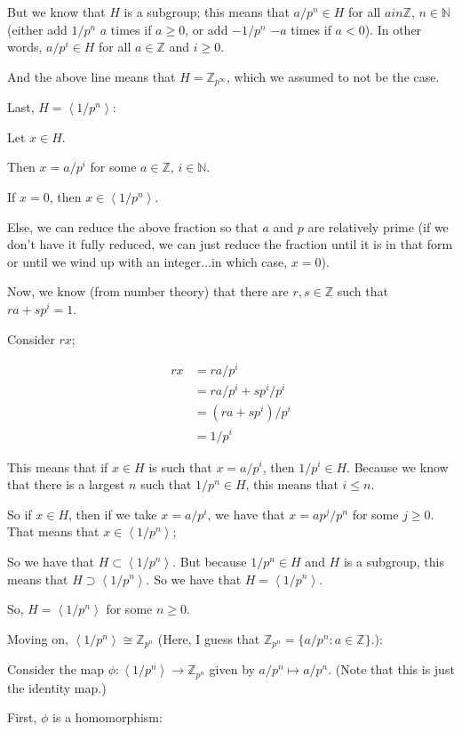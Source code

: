 \documentclass[a4paper,12pt]{article}
\newcommand{\tab}{\hspace{4mm}} %
\newcommand{\anbrack}[1]{\left\langle #1 \right\rangle}
\newcommand{\N}{\mathbb{N}}
\newcommand{\Z}{\mathbb{Z}}
\begin{document}
\tab But we know that $H$ is a subgroup; this means that $a/p^n \in H$ for all $a in \Z$, $n \in \N$ (either add $1/p^n$ $a$ times if $a \geq 0$, or add $-1/p^n$ $-a$ times if $a < 0$). In other words, $a/p^i \in H$ for all $a \in \Z$ and $i \geq 0$.

\tab And the above line means that $H = \Z_{p^\infty}$, which we assumed to not be the case.

Last, $H = \anbrack{1/p^n}$:

\tab Let $x \in H$.

\tab Then $x = a/p^i$ for some $a \in \Z$, $i \in \N$.

\tab If $x = 0$, then $x \in \anbrack{1/p^n}$.

\tab Else, we can reduce the above fraction so that $a$ and $p$ are relatively prime (if we don't have it fully reduced, we can just reduce the fraction until it is in that form or until we wind up with an integer...in which case, $x=0$).

\tab Now, we know (from number theory) that there are $r,s \in \Z$ such that $ra+sp^i = 1$.

\tab Consider $rx$;

\begin{align*}
rx &= ra/p^i\\
&= ra/p^i + sp^i/p^i\\
&= (ra+sp^i)/p^i\\
&= 1/p^i
\end{align*}

\tab This means that if $x \in H$ is such that $x=a/p^i$, then $1/p^i \in H$. Because we know that there is a largest $n$ such that $1/p^n \in H$, this means that $i \leq n$.

\tab So if $x \in H$, then if we take $x=a/p^i$, we have that $x=ap^j/p^n$ for some $j \geq 0$. That means that $x \in \anbrack{1/p^n}$;

\tab So we have that $H \subset \anbrack{1/p^n}$. But because $1/p^n \in H$ and $H$ is a subgroup, this means that $H \supset \anbrack{1/p^n}$. So we have that $H = \anbrack{1/p^n}$.

So, $H = \anbrack{1/p^n}$ for some $n \geq 0$.

Moving on, $\anbrack{1/p^n} \cong \Z_{p^n}$ (Here, I guess that $\Z_{p^n} = \{a/p^n: a \in \Z\}$.):

\tab Consider the map $\phi: \anbrack{1/p^n} \to \Z_{p^n}$ given by $a/p^n \mapsto a/p^n$. (Note that this is just the identity map.)

First, $\phi$ is a homomorphism:
\end{document}
